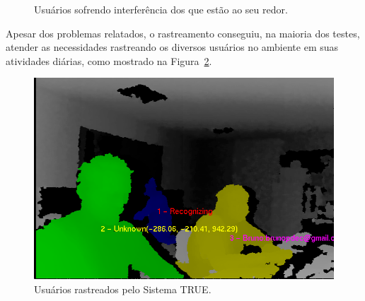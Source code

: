 		\begin{figure}[htb]
			\begin{center}
			\end{center}
			\caption{Usuários sofrendo interferência dos que estão ao seu redor.}
			\label{fig:testes_relacionamento_com_usuarios}
		\end{figure}

	Apesar dos problemas relatados, o rastreamento conseguiu, na maioria dos testes, atender as necessidades rastreando os diversos usuários no ambiente em suas atividades diárias, como mostrado na Figura~\ref{fig:varios-usuarios-ambiente}.

	\begin{figure}[htb]
			\begin{center}
				\includegraphics[scale=0.5]{figuras/5.Testes/oclusao/usuarios-rastreados.png}
			\end{center}
			\caption{Usuários rastreados pelo Sistema TRUE.}
			\label{fig:varios-usuarios-ambiente}
		\end{figure}
		
	